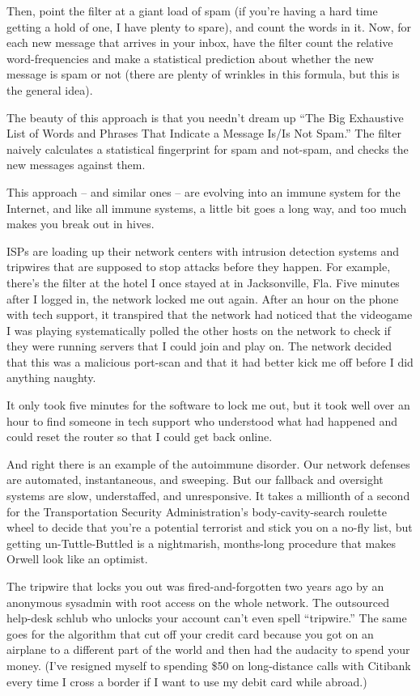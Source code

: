 Then, point the filter at a giant load of spam (if you’re having a
hard time getting a hold of one, I have plenty to spare), and count
the words in it. Now, for each new message that arrives in your
inbox, have the filter count the relative word-frequencies and make
a statistical prediction about whether the new message is spam or
not (there are plenty of wrinkles in this formula, but this is the
general idea).

The beauty of this approach is that you needn’t dream up “The Big
Exhaustive List of Words and Phrases That Indicate a Message Is/Is
Not Spam.” The filter naively calculates a statistical fingerprint
for spam and not-spam, and checks the new messages against them.

This approach -- and similar ones -- are evolving into an immune
system for the Internet, and like all immune systems, a little bit
goes a long way, and too much makes you break out in hives.

ISPs are loading up their network centers with intrusion detection
systems and tripwires that are supposed to stop attacks before they
happen. For example, there’s the filter at the hotel I once stayed
at in Jacksonville, Fla. Five minutes after I logged in, the
network locked me out again. After an hour on the phone with tech
support, it transpired that the network had noticed that the
videogame I was playing systematically polled the other hosts on
the network to check if they were running servers that I could join
and play on. The network decided that this was a malicious
port-scan and that it had better kick me off before I did anything
naughty.

It only took five minutes for the software to lock me out, but it
took well over an hour to find someone in tech support who
understood what had happened and could reset the router so that I
could get back online.

And right there is an example of the autoimmune disorder. Our
network defenses are automated, instantaneous, and sweeping. But
our fallback and oversight systems are slow, understaffed, and
unresponsive. It takes a millionth of a second for the
Transportation Security Administration’s body-cavity-search
roulette wheel to decide that you’re a potential terrorist and
stick you on a no-fly list, but getting un-Tuttle-Buttled is a
nightmarish, months-long procedure that makes Orwell look like an
optimist.

The tripwire that locks you out was fired-and-forgotten two years
ago by an anonymous sysadmin with root access on the whole network.
The outsourced help-desk schlub who unlocks your account can’t even
spell ``tripwire.'' The same goes for the algorithm that cut off your
credit card because you got on an airplane to a different part of
the world and then had the audacity to spend your money. (I’ve
resigned myself to spending \$50 on long-distance calls with
Citibank every time I cross a border if I want to use my debit card
while abroad.)

